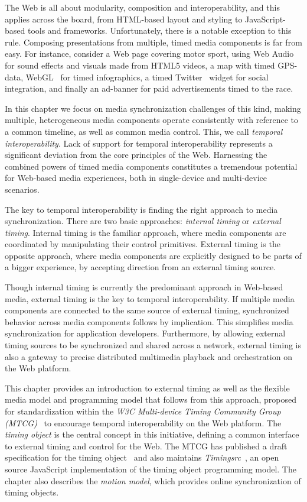 The Web is all about modularity, composition and interoperability, and this
applies across the board, from HTML-based layout and styling to JavaScript-based
tools and frameworks. Unfortunately, there is a notable exception to
this rule. Composing presentations from multiple, timed media components is
far from easy. For instance, consider a Web page covering motor sport, using
Web Audio~\cite{webaudio} for sound effects and visuals made from HTML5
videos, a map with timed GPS-data, WebGL~\cite{webgl} for timed infographics,
a timed Twitter~\cite{twitter} widget for social integration, and finally an
ad-banner for paid advertisements timed to the race.

In this chapter we focus on media synchronization challenges of this kind,
making multiple, heterogeneous media components operate consistently with
reference to a common timeline, as well as common media control. This, we call
\emph{temporal interoperability}. Lack of support for temporal
interoperability represents a significant deviation from the core principles
of the Web. Harnessing the combined powers of timed media components
constitutes a tremendous potential for Web-based media experiences, both in
single-device and multi-device scenarios.

The key to temporal interoperability is finding the right approach to media
synchronization. There are two basic approaches: \emph{internal
timing} or \emph{external timing}. Internal timing
is the familiar approach, where media components are coordinated by
manipulating their control primitives. External timing is the
opposite approach, where media components are explicitly designed to be parts
of a bigger experience, by accepting direction from an external timing source.

Though internal timing is currently the predominant approach in Web-based media, 
external timing is the key to temporal interoperability.
If multiple media components are connected to the same source of external timing,
synchronized behavior across media components follows by implication. This
simplifies media synchronization for application developers. Furthermore,
by allowing external timing sources to be synchronized and shared across a
network, external timing is also a gateway to precise distributed multimedia
playback and orchestration on the Web platform.

This chapter provides an introduction to external timing as well as the
flexible media model and programming model that follows from this approach,
proposed for standardization within the \emph{W3C Multi-device Timing
Community Group (MTCG)}~\cite{mtcg} to encourage temporal interoperability on
the Web platform. The \emph{timing object} is the central concept in this
initiative, defining a common interface to external timing and control for the
Web. The MTCG has published a draft specification for the timing
object~\cite{timingobject} and also maintains
\emph{Timingsrc}~\cite{timingsrc}, an open source JavaScript implementation of
the timing object programming model. The chapter also describes the
\emph{motion model}, which provides online synchronization of timing objects.


